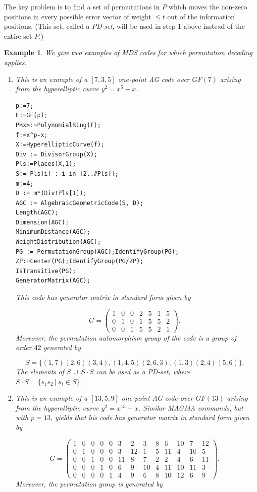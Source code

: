 \documentclass[12pt]{article}
\newtheorem{example}[theorem]{Example}
\numberwithin{equation}{section}
\begin{document}
The key problem is 
to find a set of permutations in $P$ which moves 
the non-zero positions in every possible error vector
of weight $\leq t$ out of the information positions.
(This set, called a {\it PD-set}, will be used in step
1 above instead of the entire set $P$.)

\begin{example}
We give two examples of MDS codes 
for which permutation decoding applies.

\begin{enumerate}
\item
This is an example of a $[7,3,5]$ one-point AG
code over $GF(7)$ arising from the hyperelliptic curve
$y^2=x^5-x$.

{\small{
\begin{verbatim}
p:=7;
F:=GF(p);
P<x>:=PolynomialRing(F);
f:=x^p-x;
X:=HyperellipticCurve(f);
Div := DivisorGroup(X);
Pls:=Places(X,1);
S:=[Pls[i] : i in [2..#Pls]];
m:=4;
D := m*(Div!Pls[1]);
AGC := AlgebraicGeometricCode(S, D);
Length(AGC);
Dimension(AGC);
MinimumDistance(AGC);
WeightDistribution(AGC);
PG := PermutationGroup(AGC);IdentifyGroup(PG);
ZP:=Center(PG);IdentifyGroup(PG/ZP);
IsTransitive(PG);
GeneratorMatrix(AGC);
\end{verbatim}
}}
This code has generator matrix in standard form given by

\[
G=
\left(
\begin{array}{ccccccc}
1 &0 &0 &2 &5 &1 &5\\
0 &1 &0 &1 &5 &5 &2\\
0 &0 &1 &5 &5 &2 &1
\end{array}
\right).
\]
Moreover, the permutation automorphism group of the code is a group
of order $42$ generated by

\[
S=\{ (1, 7)(2, 6)(3, 4), (1, 4, 5)(2, 6, 3),  (1, 3)(2, 4)(5, 6)\}.
\]
The elements of $S\, \cup \, S\cdot S$ can be used as a PD-set,
where $S\cdot S=\{s_1s_2\ |\ s_i\in S\}$.

\item
This is an example of a $[13,5,9]$ one-point AG
code over $GF(13)$ arising from the hyperelliptic curve
$y^2=x^{13}-x$. Similar MAGMA commands, but with $p=13$, 
yields that his code has generator matrix in standard form given by

\[
G=
\left(
\begin{array}{ccccccccccccc}
1 &  0 &  0 &  0 &  0 &  3 &  2 &  3 &  8 &  6 & 10 &  7 & 12\\
0 &  1 &  0 &  0 &  0 &  3 & 12 &  1 &  5 & 11 &  4 & 10  & 5\\
0 &  0 &  1 &  0 &  0 & 11 &  8  & 7 &  2  & 2 &  4 &  6 & 11\\
0 &  0 &  0 &  1 &  0 &  6 &  9 & 10 &  4 & 11 & 10 & 11  & 3\\
0 &  0 &  0 &  0 &  1 &  4 &  9 &  6 &  8 & 10 & 12 & 6 &  9
\end{array}
\right).
\]
Moreover, the permutation group is generated by


\end{enumerate}
\end{example}
\end{document}
